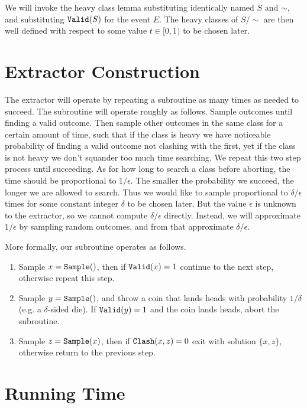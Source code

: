 We will invoke the heavy class lemma substituting identically named $S$ and $\sim$, and substituting $\mathtt{Valid}(S)$ for the event $E$.
The heavy classes of $S/\sim$ are then well defined with respect to some value $t\in[0,1)$ to be chosen later.


\section{Extractor Construction}

The extractor will operate by repeating a subroutine as many times as needed to succeed.
The subroutine will operate roughly as follows.
Sample outcomes until finding a valid outcome.
Then sample other outcomes in the same class for a certain amount of time, such that if the class is heavy we have noticeable probability of finding a valid outcome not clashing with the first, yet if the class is not heavy we don't squander too much time searching.
We repeat this two step process until succeeding.
As for how long to search a class before aborting, the time should be proportional to $1/\epsilon$.
The smaller the probability we succeed, the longer we are allowed to search.
Thus we would like to sample proportional to $\delta/\epsilon$ times for some constant integer $\delta$ to be chosen later.
But the value $\epsilon$ is unknown to the extractor, so we cannot compute $\delta/\epsilon$ directly.
Instead, we will approximate $1/\epsilon$ by sampling random outcomes, and from that approximate $\delta/\epsilon$.

More formally, our subroutine operates as follows.
\begin{enumerate}
    \item
    Sample $x=\mathtt{Sample}()$, then if $\mathtt{Valid}(x)=1$ continue to the next step, otherwise repeat this step.

    \item
    Sample $y=\mathtt{Sample}()$, and throw a coin that lands heads with probability $1/\delta$ (e.g. a $\delta$-sided die).
    If $\mathtt{Valid}(y)=1$ and the coin lands heads, abort the subroutine.

    \item
    Sample $z=\mathtt{Sample}(x)$, then if $\mathtt{Clash}(x,z)=0$ exit with solution $\{x,z\}$, otherwise return to the previous step.
\end{enumerate}


\section{Running Time}

